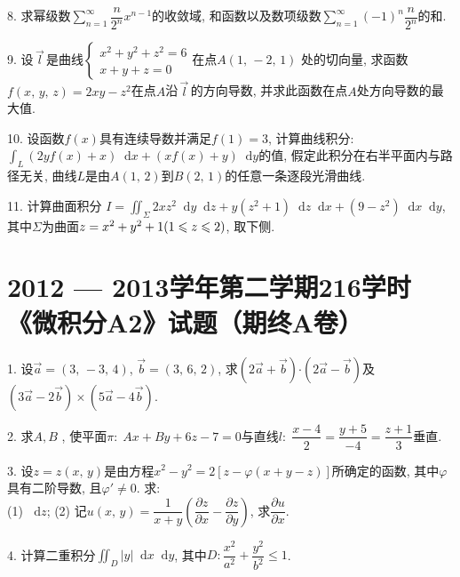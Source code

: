 \documentclass{article}
\newcommand*{\dif}{\mathop{}\!\mathrm{d}}
\begin{document}
8. 求幂级数$\displaystyle\sum\limits_{n=1}^{\infty}{\dfrac{n}{2^n}x^{n-1}}$的收敛域, 和函数以及数项级数$\displaystyle\sum\limits_{n=1}^\infty{(-1)^n\dfrac{n}{2^n}}$的和. \par

9. 设$\,\vec{l}\,$是曲线$\begin{cases}x^2+y^2+z^2=6\\ x+y+z=0\end{cases}$在点$A(1,\,-2,\,1)$
处的切向量, 求函数$f(x,\,y,\,z)=2xy-z^2$在点$A$沿$\,\vec{l}\,$的方向导数, 
并求此函数在点$A$处方向导数的最大值. \par

10. 设函数$f(x)$具有连续导数并满足$f(1)=3$, 计算曲线积分:
$\displaystyle\int_L{(2y f(x) + x)\dif x + (x f(x) + y)\dif y}$的值, 假定此积分在右半平面内与路径无关, 曲线$L$是由$A(1,\,2)$到$B(2,\,1)$的任意一条逐段光滑曲线.\par

11. 计算曲面积分
$I=\displaystyle\iint_\Sigma{2xz^2\dif y \dif z + y(z^2+1)\dif z \dif x + (9-z^2)\dif x \dif y}$, 
其中$\Sigma$为曲面$z=x^2+y^2+1\\(1\leqslant z\leqslant 2)$, 取下侧.\par

\newpage

\section*{2012 --- 2013学年第二学期216学时《微积分A2》试题（期终A卷）}

1. 设$\vec{a}=(3,\,-3,\,4)$, $\vec{b}=(3,\,6,\,2)$, 求$(2\vec{a}+\vec{b}) \bm\cdot (2\vec{a}-\vec{b})$及$(3\vec{a} - 2\vec{b}) \times (5\vec{a} - 4\vec{b})$.\par

2. 求$A, B$ , 使平面$\pi: \; Ax+By+6z-7=0$与直线$l:\; \dfrac{x-4}{2}=\dfrac{y+5}{-4}=\dfrac{z+1}{3}$垂直.\par

3. 设$z=z(x,\,y)$是由方程$x^2-y^2=2[z- \varphi(x+y-z)]$所确定的函数, 其中$\varphi$具有二阶导数, 且$\varphi' \neq 0$. 求: \\
(1) $\dif z$; (2) 记$u(x,\,y)=\dfrac{1}{x+y}\left(\dfrac{\partial z}{\partial x} - \dfrac{\partial z}{\partial y}\right)$, 求$\dfrac{\partial u}{\partial x}$. \par

4. 计算二重积分$\displaystyle\iint_D{|y| \dif x \dif y}$, 其中$D: \dfrac{x^2}{a^2}+\dfrac{y^2}{b^2} \leqslant 1$. \par
\end{document}
